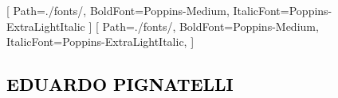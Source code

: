 \usepackage{etex}
\usepackage{enumitem}
\usepackage{CormorantGaramond}
\usepackage{import}

\usepackage{xltxtra,fontspec,xunicode}
[
    Path=./fonts/,
    BoldFont=Poppins-Medium,
    ItalicFont=Poppins-ExtraLightItalic
    ]
\setmonofont{Poppins-ExtraLight}[
    Path=./fonts/,
    BoldFont=Poppins-Medium,
    ItalicFont=Poppins-ExtraLightItalic,
    ]


\renewcommand{\emph}[1]{\textcolor{black}{\textbf{#1}}}

\subsection*{\emph{\huge\MakeUppercase{Eduardo Pignatelli}}}








































